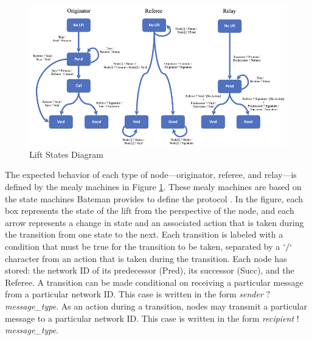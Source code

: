 \documentclass[runningheads]{llncs}
\newcommand{\figref}[1]{Figure \ref{#1}}
\newif\ifcomments
\newif\ifkylecomments
\newcommand{\egm}[1]{\ifcomments\textcolor{orange}{egm: #1}\fi}
\newcommand{\krs}[1]{\ifkylecomments\textcolor{blue}{krs: #1}\fi}
\begin{document}
\begin{figure}
    \centering
    \includegraphics[scale=0.42]{LiftStatesSeperate.png}
    \caption{Lift States Diagram}
    \label{fig:liftStates}
\end{figure}

The expected behavior of each type of node---originator, referee, and relay---is defined by the mealy machines in \figref{fig:liftStates}.
These mealy machines are based on the state machines Bateman provides to define the protocol \cite{bateman_state_machines}.
In the figure, each box represents the state of the lift from the perspective of the node, and each arrow represents a change in state and an associated action that is taken during the transition from one state to the next. Each transition is labeled with a condition that must be true for the transition to be taken, separated by a $`/`$ character from an action that is taken during the transition. Each node has stored: the network ID of its predecessor (Pred), its successor (Succ), and the Referee. A transition can be made conditional on receiving a particular message from a particular network ID. This case is written in the form \emph{sender} $?$ \emph{message\_type}. As an action during a transition, nodes may transmit a particular message to a particular network ID. This case is written in the form \emph{recipient} $!$ \emph{message\_type}. 

\krs{Below is a shot at this. Is this convincing enough?
\egm{Maybe rework the following paragraph to state that the Mealy machines define the behavior of each role that is used for verification in the following sections. Here I would be tempted to make clear any differences from the state machines and the actual verification models if any. Leave the section references as you have them. Also, create some macros called \textbackslash figref and \textbackslash secref that create the section and figure references. See any of my papers for an example.}
\krs{We don't talk about ignoring PEND messages, but I think it just distracts from the message. We can probably omit it. Folks might ask because it is in the Mealy Machines}
\egm{In the section on the mealy machines, I suggest the addition of a closing paragraph that states what is different in the verification models and why such a change is inconsequential to the verification result. It is in that paragraph that I would make clear why the pending messages are not relevant.}}
\end{document}
